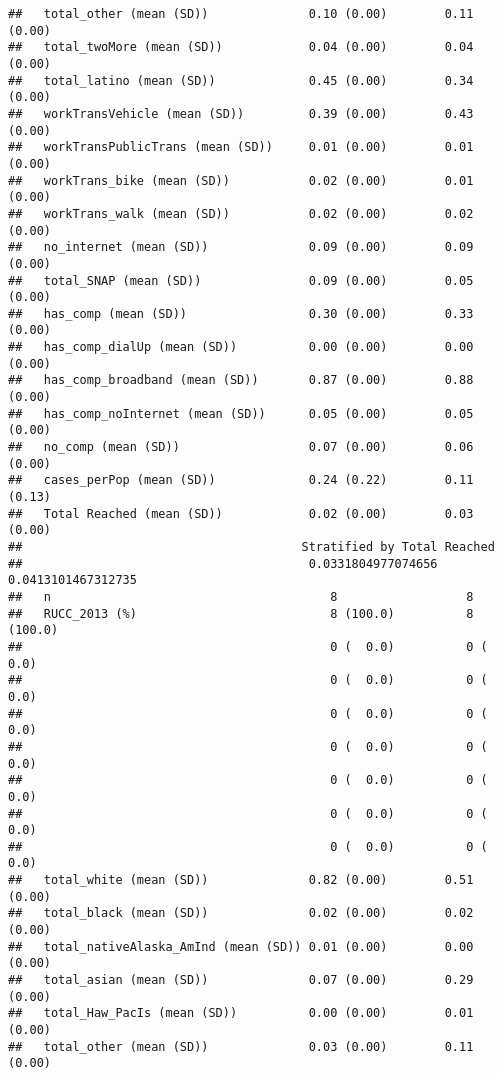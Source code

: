 \documentclass[
]{article}
\begin{document}
\begin{verbatim}
##   total_other (mean (SD))              0.10 (0.00)        0.11 (0.00)       
##   total_twoMore (mean (SD))            0.04 (0.00)        0.04 (0.00)       
##   total_latino (mean (SD))             0.45 (0.00)        0.34 (0.00)       
##   workTransVehicle (mean (SD))         0.39 (0.00)        0.43 (0.00)       
##   workTransPublicTrans (mean (SD))     0.01 (0.00)        0.01 (0.00)       
##   workTrans_bike (mean (SD))           0.02 (0.00)        0.01 (0.00)       
##   workTrans_walk (mean (SD))           0.02 (0.00)        0.02 (0.00)       
##   no_internet (mean (SD))              0.09 (0.00)        0.09 (0.00)       
##   total_SNAP (mean (SD))               0.09 (0.00)        0.05 (0.00)       
##   has_comp (mean (SD))                 0.30 (0.00)        0.33 (0.00)       
##   has_comp_dialUp (mean (SD))          0.00 (0.00)        0.00 (0.00)       
##   has_comp_broadband (mean (SD))       0.87 (0.00)        0.88 (0.00)       
##   has_comp_noInternet (mean (SD))      0.05 (0.00)        0.05 (0.00)       
##   no_comp (mean (SD))                  0.07 (0.00)        0.06 (0.00)       
##   cases_perPop (mean (SD))             0.24 (0.22)        0.11 (0.13)       
##   Total Reached (mean (SD))            0.02 (0.00)        0.03 (0.00)       
##                                       Stratified by Total Reached
##                                        0.0331804977074656 0.0413101467312735
##   n                                       8                  8              
##   RUCC_2013 (%)                           8 (100.0)          8 (100.0)      
##                                           0 (  0.0)          0 (  0.0)      
##                                           0 (  0.0)          0 (  0.0)      
##                                           0 (  0.0)          0 (  0.0)      
##                                           0 (  0.0)          0 (  0.0)      
##                                           0 (  0.0)          0 (  0.0)      
##                                           0 (  0.0)          0 (  0.0)      
##                                           0 (  0.0)          0 (  0.0)      
##   total_white (mean (SD))              0.82 (0.00)        0.51 (0.00)       
##   total_black (mean (SD))              0.02 (0.00)        0.02 (0.00)       
##   total_nativeAlaska_AmInd (mean (SD)) 0.01 (0.00)        0.00 (0.00)       
##   total_asian (mean (SD))              0.07 (0.00)        0.29 (0.00)       
##   total_Haw_PacIs (mean (SD))          0.00 (0.00)        0.01 (0.00)       
##   total_other (mean (SD))              0.03 (0.00)        0.11 (0.00)       

\end{verbatim}
\end{document}
